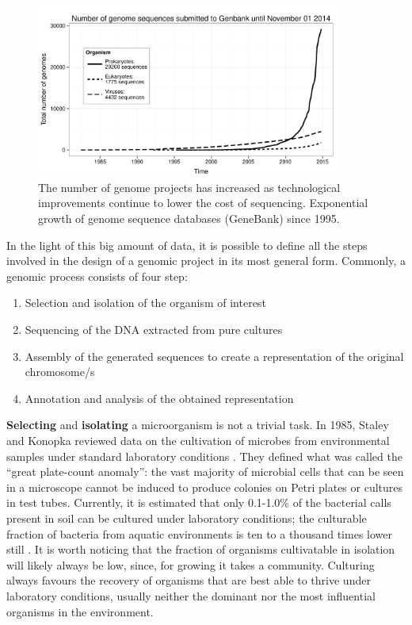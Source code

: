 \begin{figure}[!tb]
	\centering
	\includegraphics[width=0.9\textwidth]{./figures/Introduction/seq_number_genebank}
  	\caption{The number of genome projects has increased as technological improvements continue to lower the cost of sequencing. Exponential growth of genome sequence databases (GeneBank) since 1995. \label{fig:numseq}}
\end{figure}%
In the light of this big amount of data, it is possible to define all the steps involved in the design of a genomic project in its most general form. Commonly, a genomic process consists of four step:
\vspace{-3mm}
\begin{enumerate}[nosep]
\item Selection and isolation of the organism of interest
\item Sequencing of the DNA extracted from pure cultures
\item Assembly of the generated sequences to create a representation of the original chromosome/s
\item Annotation and analysis of the obtained representation
\end{enumerate}
\textbf{Selecting} and \textbf{isolating} a microorganism is not a trivial task. In 1985, Staley and Konopka reviewed data on the cultivation of microbes from environmental samples under standard laboratory conditions \cite{staley1985measurement}. They defined what was called the ``great plate-count anomaly'': the vast majority of microbial cells that can be seen in a microscope cannot be induced to produce colonies on Petri plates or cultures in test tubes. Currently, it is estimated that only 0.1-1.0\% of the bacterial calls present in soil can be cultured under laboratory conditions; the culturable fraction of bacteria from aquatic environments is ten to a thousand times lower still \cite{kirk2004methods, oliver2005viable}. It is worth noticing that the fraction of organisms cultivatable in isolation will likely always be low, since, for growing it takes a community. Culturing always favours the recovery of organisms that are best able to thrive under laboratory conditions, usually neither the dominant nor the most influential organisms in the environment.\\%
